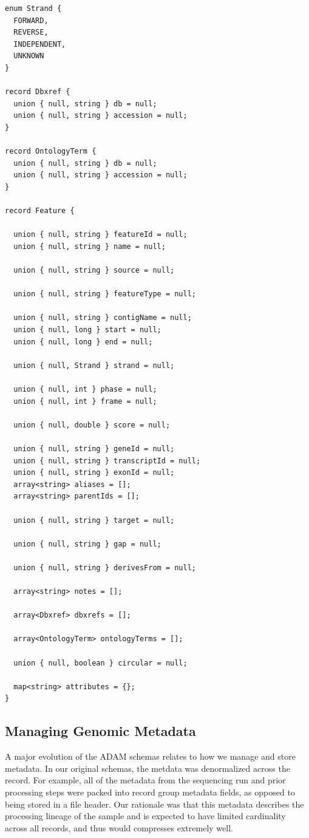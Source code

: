 \documentclass[phd]{ucbthesis}
\begin{document}
\begin{lstlisting}[caption=\textsc{ADAM}'s feature schemas]
enum Strand {
  FORWARD,
  REVERSE,
  INDEPENDENT,
  UNKNOWN
}

record Dbxref {
  union { null, string } db = null;
  union { null, string } accession = null;
}

record OntologyTerm {
  union { null, string } db = null;
  union { null, string } accession = null;
}

record Feature {

  union { null, string } featureId = null;
  union { null, string } name = null;

  union { null, string } source = null;

  union { null, string } featureType = null;

  union { null, string } contigName = null;
  union { null, long } start = null;
  union { null, long } end = null;

  union { null, Strand } strand = null;

  union { null, int } phase = null;
  union { null, int } frame = null;

  union { null, double } score = null;

  union { null, string } geneId = null;
  union { null, string } transcriptId = null;
  union { null, string } exonId = null;
  array<string> aliases = [];
  array<string> parentIds = [];

  union { null, string } target = null;

  union { null, string } gap = null;

  union { null, string } derivesFrom = null;

  array<string> notes = [];

  array<Dbxref> dbxrefs = [];

  array<OntologyTerm> ontologyTerms = [];

  union { null, boolean } circular = null;

  map<string> attributes = {};
}
\end{lstlisting}

\subsection{Managing Genomic Metadata}
\label{sec:metadata}

A major evolution of the \textsc{ADAM} schemas relates to how we manage and
store metadata. In our original schemas, the metdata was denormalized across the
record. For example, all of the metadata from the sequencing run and prior
processing steps were packed into record group metadata fields, as opposed to
being stored in a file header. Our rationale was that this metadata describes
the processing lineage of the sample and is expected to have limited cardinality
across all records, and thus would compresses extremely well.
\end{document}
